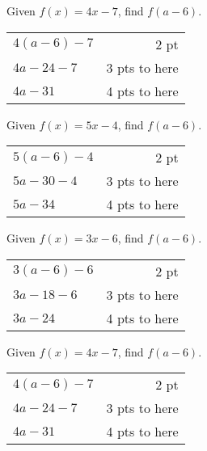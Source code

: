 {
	Given $f(x)=4x-7$, find $f(a-6)$.
}
{
	\begin{tabular}{l r}
	$4(a-6)-7$ & 2 pt\\
	$4a-24-7$ & 3 pts to here\\
	$4a-31$ & 4 pts to here
	\end{tabular}
}

{
	Given $f(x)=5x-4$, find $f(a-6)$.
}
{
	\begin{tabular}{l r}
	$5(a-6)-4$ & 2 pt\\
	$5a-30-4$ & 3 pts to here\\
	$5a-34$ & 4 pts to here
	\end{tabular}
}

{
	Given $f(x)=3x-6$, find $f(a-6)$.
}
{
	\begin{tabular}{l r}
	$3(a-6)-6$ & 2 pt\\
	$3a-18-6$ & 3 pts to here\\
	$3a-24$ & 4 pts to here
	\end{tabular}
}

{
	Given $f(x)=4x-7$, find $f(a-6)$.
}
{
	\begin{tabular}{l r}
	$4(a-6)-7$ & 2 pt\\
	$4a-24-7$ & 3 pts to here\\
	$4a-31$ & 4 pts to here
	\end{tabular}
}
